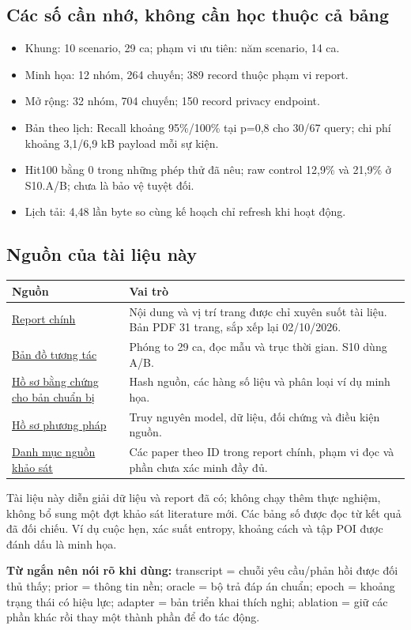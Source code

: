 \documentclass[10pt,a4paper]{article}
\begin{document}
\subsection*{Các số cần nhớ, không cần học thuộc cả bảng}
\begin{itemize}
\item Khung: 10 scenario, 29 ca; phạm vi ưu tiên: năm scenario, 14 ca.
\item Minh họa: 12 nhóm, 264 chuyến; 389 record thuộc phạm vi report.
\item Mở rộng: 32 nhóm, 704 chuyến; 150 record privacy endpoint.
\item Bản theo lịch: Recall khoảng 95\%/100\% tại p=0,8 cho 30/67 query; chi phí khoảng 3,1/6,9 kB payload mỗi sự kiện.
\item Hit100 bằng 0 trong những phép thử đã nêu; raw control 12,9\% và 21,9\% ở S10.A/B; chưa là bảo vệ tuyệt đối.
\item Lịch tải: 4,48 lần byte so cùng kế hoạch chỉ refresh khi hoạt động.
\end{itemize}

\subsection*{Nguồn của tài liệu này}
\begin{longtable}{@{}P{5.0cm}P{11.2cm}@{}}
\toprule Nguồn & Vai trò\\\midrule
\href{report_explained.pdf}{Report chính} & Nội dung và vị trí trang được chỉ xuyên suốt tài liệu. Bản PDF 31 trang, sắp xếp lại 02/10/2026.\\[4pt]
\href{sample_maps.html}{Bản đồ tương tác} & Phóng to 29 ca, đọc mẫu và trục thời gian. S10 dùng A/B.\\[4pt]
\href{preparation_evidence.json}{Hồ sơ bằng chứng cho bản chuẩn bị} & Hash nguồn, các hàng số liệu và phân loại ví dụ minh họa.\\[4pt]
\href{method_evidence.json}{Hồ sơ phương pháp} & Truy nguyên model, dữ liệu, đối chứng và điều kiện nguồn.\\[4pt]
\href{sources.json}{Danh mục nguồn khảo sát} & Các paper theo ID trong report chính, phạm vi đọc và phần chưa xác minh đầy đủ.\\
\bottomrule
\end{longtable}
Tài liệu này diễn giải dữ liệu và report đã có; không chạy thêm thực nghiệm, không bổ sung một đợt khảo sát literature mới. Các bảng số được đọc từ kết quả đã đối chiếu. Ví dụ cuộc hẹn, xác suất entropy, khoảng cách và tập POI được đánh dấu là minh họa.

\textbf{Từ ngắn nên nói rõ khi dùng:} transcript = chuỗi yêu cầu/phản hồi được đối thủ thấy; prior = thông tin nền; oracle = bộ trả đáp án chuẩn; epoch = khoảng trạng thái có hiệu lực; adapter = bản triển khai thích nghi; ablation = giữ các phần khác rồi thay một thành phần để đo tác động.
\end{document}
